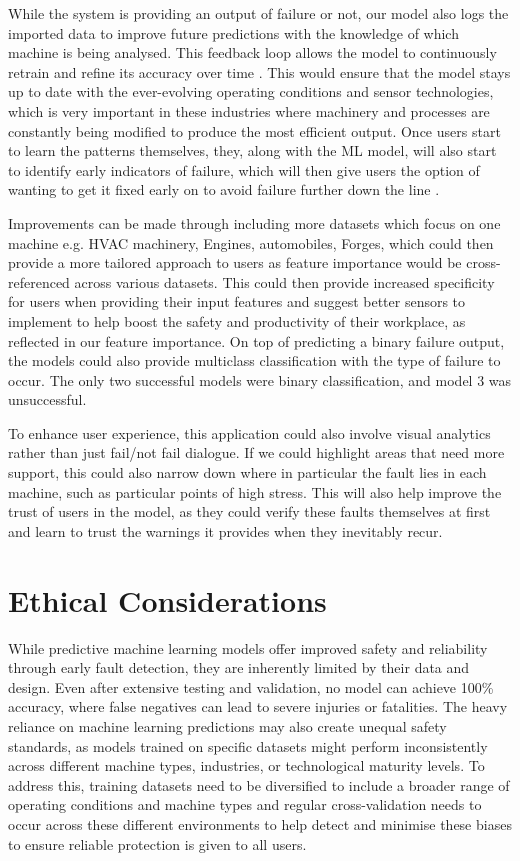 \documentclass[11pt]{article}
\begin{document}
While the system is providing an output of failure or not, our model also logs the imported data to improve future predictions with the knowledge of which machine is being analysed. This feedback loop allows the model to continuously retrain and refine its accuracy over time \cite{engineeringscience2025}. This would ensure that the model stays up to date with the ever-evolving operating conditions and sensor technologies, which is very important in these industries where machinery and processes are constantly being modified to produce the most efficient output. Once users start to learn the patterns themselves, they, along with the ML model, will also start to identify early indicators of failure, which will then give users the option of wanting to get it fixed early on to avoid failure further down the line \cite{aws2025}.

Improvements can be made through including more datasets \cite{sethi2023} which focus on one machine e.g. HVAC machinery, Engines, automobiles, Forges, which could then provide a more tailored approach to users as feature importance would be cross-referenced across various datasets. This could then provide increased specificity for users when providing their input features and suggest better sensors to implement to help boost the safety and productivity of their workplace, as reflected in our feature importance. On top of predicting a binary failure output, the models could also provide multiclass classification with the type of failure to occur. The only two successful models were binary classification, and model 3 was unsuccessful. 

To enhance user experience, this application could also involve visual analytics rather than just fail/not fail dialogue. If we could highlight areas that need more support, this could also narrow down where in particular the fault lies in each machine, such as particular points of high stress. This will also help improve the trust of users in the model, as they could verify these faults themselves at first and learn to trust the warnings it provides when they inevitably recur.



\section{Ethical Considerations}

While predictive machine learning models offer improved safety and reliability through early fault detection, they are inherently limited by their data and design. Even after extensive testing and validation, no model can achieve 100\% accuracy, where false negatives can lead to severe injuries or fatalities. The heavy reliance on machine learning predictions may also create unequal safety standards, as models trained on specific datasets might perform inconsistently across different machine types, industries, or technological maturity levels. To address this, training datasets need to be diversified to include a broader range of operating conditions and machine types and regular cross-validation needs to occur across these different environments to help detect and minimise these biases to ensure reliable protection is given to all users.\\
\end{document}
